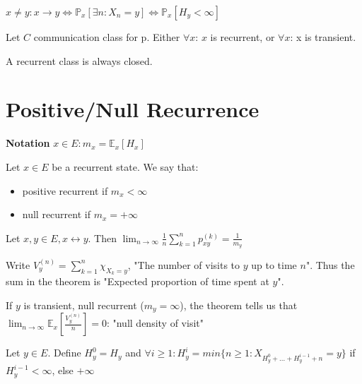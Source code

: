 \begin{rmk}[]
	$x \neq y: x \to y \iff \mathbb{P}_{x} \left[ \exists n: X_n=y \right] \iff \mathbb{P}_{x} \left[ H_y<\infty \right] $
\end{rmk}

\begin{cor}[]
	Let $C$ communication class for p. Either $\forall x$: $x$ is recurrent, or $\forall x$: x is transient.
\end{cor}

\begin{cor}[]
	A recurrent class is always closed.
\end{cor}

\section{Positive/Null Recurrence}
\textbf{Notation} $x \in E: m_{x}=\mathbb{E}_{x} \left[ H_x \right] $

\begin{defn}
	Let $x \in E$ be a recurrent state. We say that:
\begin{itemize}
	\item positive recurrent if $m_x<\infty$ 
	\item null recurrent if $m_x=+\infty$
\end{itemize}

\end{defn}

\begin{theorem}[]
	Let $x,y \in E, x \leftrightarrow y$. Then $\lim_{n \to \infty}\frac{1}{n}\sum_{k=1}^{n} p_{xy}^{(k)}=\frac{1}{m_{y}}$
\end{theorem}
\begin{rmk}[]
	Write $V_{y}^{(n)}=\sum_{k=1}^{n} \chi_{X_k=y}$, "The number of visits to $y$ up to time $n$". Thus the sum in the theorem is "Expected proportion of time spent at $y$".
\end{rmk}

If $y$ is transient, null recurrent ($m_y=\infty$), the theorem tells us that $\lim_{n \to \infty}\mathbb{E}_{x} \left[ \frac{V_y^{(n)}}{n} \right] =0$: "null density of visit"

\begin{defn}
	Let $y \in E$. Define $H_y^{0}=H_y$ and $\forall i\geq 1: H_{y}^{i}= min\{n \geq 1: X_{H_y^0 + ... + H_y^{i-1}+n}=y\}$ if $H_y^{i-1}<\infty$, else $+\infty$	
\end{defn}

